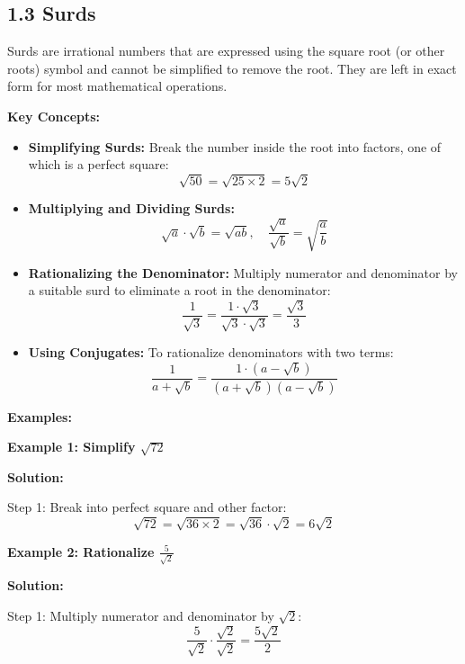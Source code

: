 
\subsection*{1.3 Surds}

Surds are irrational numbers that are expressed using the square root (or other roots) symbol and cannot be simplified to remove the root. They are left in exact form for most mathematical operations.

\textbf{Key Concepts:}
\begin{itemize}
    \item \textbf{Simplifying Surds:}  
    Break the number inside the root into factors, one of which is a perfect square:  
    \[
    \sqrt{50} = \sqrt{25 \times 2} = 5\sqrt{2}
    \]

    \item \textbf{Multiplying and Dividing Surds:}  
    \[
    \sqrt{a} \cdot \sqrt{b} = \sqrt{ab}, \quad \frac{\sqrt{a}}{\sqrt{b}} = \sqrt{\frac{a}{b}}
    \]

    \item \textbf{Rationalizing the Denominator:}  
    Multiply numerator and denominator by a suitable surd to eliminate a root in the denominator:
    \[
    \frac{1}{\sqrt{3}} = \frac{1 \cdot \sqrt{3}}{\sqrt{3} \cdot \sqrt{3}} = \frac{\sqrt{3}}{3}
    \]

    \item \textbf{Using Conjugates:}  
    To rationalize denominators with two terms:
    \[
    \frac{1}{a + \sqrt{b}} = \frac{1 \cdot (a - \sqrt{b})}{(a + \sqrt{b})(a - \sqrt{b})}
    \]
\end{itemize}

\textbf{Examples:}

\begin{flushleft}
\textbf{Example 1: Simplify \(\sqrt{72}\)}

\textbf{Solution:} \vspace{0.2cm}

Step 1: Break into perfect square and other factor:  
\[
\sqrt{72} = \sqrt{36 \times 2} = \sqrt{36} \cdot \sqrt{2} = 6\sqrt{2}
\]
\end{flushleft}

\begin{flushleft}
\textbf{Example 2: Rationalize \(\frac{5}{\sqrt{2}}\)}

\textbf{Solution:} \vspace{0.2cm}

Step 1: Multiply numerator and denominator by \(\sqrt{2}\):  
\[
\frac{5}{\sqrt{2}} \cdot \frac{\sqrt{2}}{\sqrt{2}} = \frac{5\sqrt{2}}{2}
\]
\end{flushleft}

